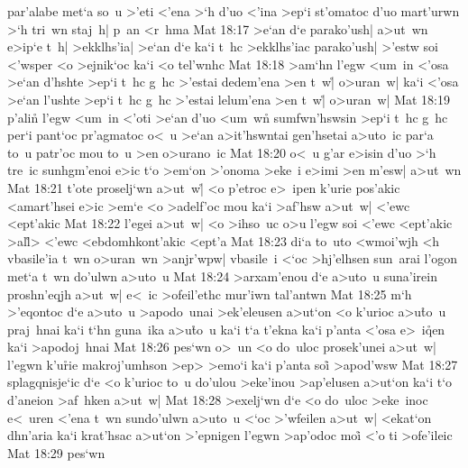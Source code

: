par'alabe
met`a
so~u
>'eti
<'ena
>`h
d'uo
<'ina
>ep`i
st'omatoc
d'uo
mart'urwn
>`h
tri~wn
staj~h|
p~an
<r~hma\bibvsend
\vs Mat 18:17
>e`an
d`e
parako'ush|
a>ut~wn
e>ip`e
t~h|
>ekklhs'ia|
>e`an
d`e
ka`i
t~hc
>ekklhs'iac
parako'ush|
>'estw
soi
<'wsper
<o
>ejnik`oc
ka`i
<o
tel'wnhc\bibvsend
\vs Mat 18:18
>am`hn
l'egw
<um~in
<'osa
>e`an
d'hshte
>ep`i
t~hc
g~hc
>'estai
dedem'ena
>en
t~w|\r{}
o>uran~w|
ka`i
<'osa
>e`an
l'ushte
>ep`i
t~hc
g~hc
>'estai
lelum'ena
>en
t~w|\r{}
o>uran~w|\bibvsend
\vs Mat 18:19
p'ali\r{n}
l'egw
<um~in
<'oti
>e`an
d'uo
<um~wn\r{}
sumfwn'hswsin
>ep`i
t~hc
g~hc
per`i
pant`oc
pr'agmatoc
o<~u
>e`an
a>it'hswntai
gen'hsetai
a>uto~ic
par`a
to~u
patr'oc
mou
to~u
>en
o>urano~ic\bibvsend
\vs Mat 18:20
o<~u
g'ar
e>isin
d'uo
>`h
tre~ic
sunhgm'enoi
e>ic
t`o
>em`on
>'onoma
>eke~i
e>imi
>en
m'esw|
a>ut~wn\bibvsend
\vs Mat 18:21
t'ote
proselj`wn
a>ut~w|\r{}
<o
p'etroc
e>~ipen
k'urie
pos'akic
<amart'hsei
e>ic
>em`e
<o
>adelf'oc
mou
ka`i
>af'hsw
a>ut~w|
<'ewc
<ept'akic\bibvsend
\vs Mat 18:22
l'egei
a>ut~w|
<o
>ihso~uc
o>u
l'egw
soi
<'ewc
<ept'akic
>al\r{l}>
<'ewc
<ebdomhkont'akic
<ept'a\bibvsend
\vs Mat 18:23
di`a
to~uto
<wmoi'wjh
<h
vbasile'ia
t~wn
o>uran~wn
>anjr'wpw|
vbasile~i
<`oc
>hj'elhsen
sun~arai
l'ogon
met`a
t~wn
do'ulwn
a>uto~u\bibvsend
\vs Mat 18:24
>arxam'enou
d`e
a>uto~u
suna'irein
proshn'eqjh
a>ut~w|
e<~ic
>ofeil'ethc
mur'iwn
tal'antwn\bibvsend
\vs Mat 18:25
m`h
>'eqontoc
d`e
a>uto~u
>apodo~unai
>ek'eleusen
a>ut`on
<o
k'urioc
a>u\r{t}o~u
praj~hnai
ka`i
t`hn
guna~ika
a>u\r{t}o~u
ka`i
t`a
t'ekna
ka`i
p'anta
<'osa
e>~i\r{q}en
ka`i
>apodoj~hnai\bibvsend
\vs Mat 18:26
pes`wn
o>~un
<o
do~uloc
prosek'unei
a>ut~w|
l'egwn
k'u\r{r}ie
makroj'umhson
>ep>
>emo`i
ka`i
p'anta
soi\r{}
>apod'wsw\bibvsend
\vs Mat 18:27
splagqnisje`ic
d`e
<o
k'urioc
to~u
do'ulou
>eke'inou
>ap'elusen
a>ut`on
ka`i
t`o
d'aneion
>af~hken
a>ut~w|\bibvsend
\vs Mat 18:28
>exelj`wn
d`e
<o
do~uloc
>eke~inoc
e<~uren
<'ena
t~wn
sundo'ulwn
a>uto~u
<`oc
>'wfeilen
a>ut~w|
<ekat`on
dhn'aria
ka`i
krat'hsac
a>ut`on
>'epnigen
l'egwn
>ap'odoc
moi\r{}
<'o
ti
>ofe'ileic\bibvsend
\vs Mat 18:29
pes`wn
